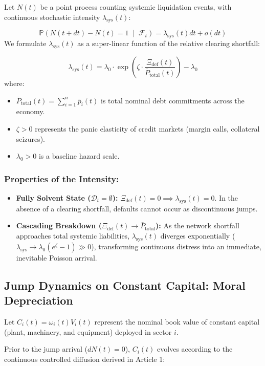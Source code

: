 \documentclass[11pt,letterpaper]{report}
\begin{document}
Let $N(t)$ be a point process counting systemic liquidation events, with continuous stochastic intensity ${\lambda }_{\mathrm{sys}}(t)$:

\[
\mathbb{P}\left( N(t + dt) - N(t) = 1 \;\middle\vert\; \mathcal{F}_t \right) = \lambda_{\text{sys}}(t) dt + o(dt)
\]
We formulate ${\lambda }_{\mathrm{sys}}(t)$ as a super-linear function of the relative clearing shortfall:

\[
{\lambda }_{\mathrm{sys}}(t)={\lambda }_{0}\cdot \exp \left({\zeta \cdot \frac{{\Xi }_{\mathrm{def}}(t)}{{\bar{P}}_{\mathrm{total}}(t)}}\right)-{\lambda }_{0}
\]
where:

\begin{itemize}
\item ${\bar{P}}_{\mathrm{total}}(t)=\sum\limits_{i=1}^{n}{\bar{p}}_{i}(t)$ is total nominal debt commitments across the economy.
\item $\zeta >0$ represents the panic elasticity of credit markets (margin calls, collateral seizures).
\item ${\lambda }_{0}>0$ is a baseline hazard scale.
\end{itemize}
\subsubsection{Properties of the Intensity:}
\begin{itemize}
\item \textbf{Fully Solvent State ($\mathcal{D}_t = \emptyset$):} $\Xi_{\text{def}}(t) = 0 \implies \lambda_{\text{sys}}(t) = 0$. In the absence of a clearing shortfall, defaults cannot occur as discontinuous jumps.
\item \textbf{Cascading Breakdown (${\Xi }_{\mathrm{def}}(t)\rightarrow {\bar{P}}_{\mathrm{total}}$):} As the network shortfall approaches total systemic liabilities, ${\lambda }_{\mathrm{sys}}(t)$ diverges exponentially (${\lambda }_{\mathrm{sys}}\rightarrow {\lambda }_{0}({e}^{\zeta }-1)\gg 0$), transforming continuous distress into an immediate, inevitable Poisson arrival.
\end{itemize}
\subsection{Jump Dynamics on Constant Capital: Moral Depreciation}
Let ${C}_{i}(t)={\omega }_{i}(t){V}_{i}(t)$ represent the nominal book value of constant capital (plant, machinery, and equipment) deployed in sector $i$.

Prior to the jump arrival ($dN(t)=0$), ${C}_{i}(t)$ evolves according to the continuous controlled diffusion derived in Article 1:
\end{document}
